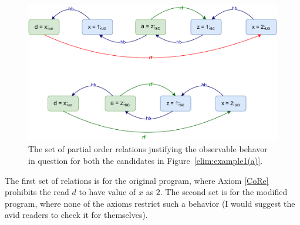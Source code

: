     \begin{figure}[H]
        \centering
        \includegraphics[scale=0.7]{6.Elimination/EliminationExample1(b).pdf}
        \caption{The set of partial order relations justifying the observable behavor in question for both the candidates in Figure~\ref{elim:example1(a)}.} 
        \label{elim:example1(b)}
    \end{figure}


    The first set of relations is for the original program, where Axiom \ref{CoRe} prohibits the read $d$ to have value of $x$ as $2$.
    The second set is for the modified program, where none of the axioms restrict such a behavior (I would suggest the avid readers to check it for themselves).
    
